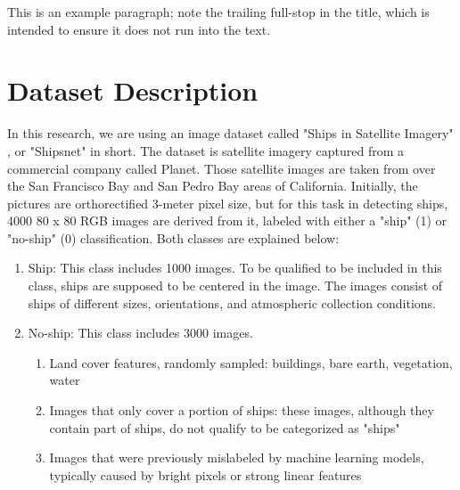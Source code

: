\documentclass[ %
                    author={Revalda Putawara},
                supervisor={Dr. James Pope},
                    degree={MSc},
                     title={Robustness of Bayesian Neural Networks Design Choices Against Weight and Bias Perturbation Induced by Single Event Upsets (SEUs)},
                      type={},
                      year={2025}]{dissertation}
\begin{document}
This is an example paragraph; note the trailing full-stop in the title,
which is intended to ensure it does not run into the text.

\fi

\section{Dataset Description} \label{section:designdataset}

In this research, we are using an image dataset called "Ships in Satellite Imagery" \cite{robert_hammell_2018}, or "Shipsnet" in short. The dataset is satellite imagery captured from a commercial company called Planet. Those satellite images are taken from over the San Francisco Bay and San Pedro Bay areas of California. Initially, the pictures are orthorectified 3-meter pixel size, but for this task in detecting ships, 4000 80 x 80 RGB images are derived from it, labeled with either a "ship" (1) or "no-ship" (0) classification. Both classes are explained below:

\begin{enumerate}
\item Ship: This class includes 1000 images. To be qualified to be included in this class, ships are supposed to be centered in the image. The images consist of ships of different sizes, orientations, and atmospheric collection conditions.
\item No-ship: This class includes 3000 images. 
    \begin{enumerate}
    \item Land cover features, randomly sampled: buildings, bare earth, vegetation, water
    \item Images that only cover a portion of ships: these images, although they contain part of ships, do not qualify to be categorized as "ships"
    \item Images that were previously mislabeled by machine learning models, typically caused by bright pixels or strong linear features
    \end{enumerate}
\end{enumerate}
\end{document}

